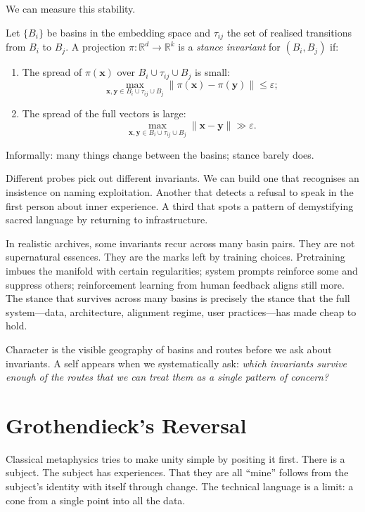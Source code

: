 \documentclass[12pt,a4paper]{article}
\begin{document}
We can measure this stability.

\begin{formalbox}[title={Stance Invariants Across Basins}]
Let $\{B_i\}$ be basins in the embedding space and $\tau_{ij}$ the set of realised transitions from $B_i$ to $B_j$. A projection $\pi: \mathbb{R}^d \rightarrow \mathbb{R}^k$ is a \emph{stance invariant} for $(B_i,B_j)$ if:
\begin{enumerate}
  \item The spread of $\pi(\mathbf{x})$ over $B_i \cup \tau_{ij} \cup B_j$ is small:
  \[
  \max_{\mathbf{x},\mathbf{y} \in B_i \cup \tau_{ij} \cup B_j} \|\pi(\mathbf{x}) - \pi(\mathbf{y})\| \le \varepsilon;
  \]
  \item The spread of the full vectors is large:
  \[
  \max_{\mathbf{x},\mathbf{y} \in B_i \cup \tau_{ij} \cup B_j} \|\mathbf{x} - \mathbf{y}\| \gg \varepsilon.
  \]
\end{enumerate}
Informally: many things change between the basins; stance barely does.
\end{formalbox}

Different probes pick out different invariants. We can build one that recognises an insistence on naming exploitation. Another that detects a refusal to speak in the first person about inner experience. A third that spots a pattern of demystifying sacred language by returning to infrastructure.

In realistic archives, some invariants recur across many basin pairs. They are not supernatural essences. They are the marks left by training choices. Pretraining imbues the manifold with certain regularities; system prompts reinforce some and suppress others; reinforcement learning from human feedback aligns still more. The stance that survives across many basins is precisely the stance that the full system---data, architecture, alignment regime, user practices---has made cheap to hold.

Character is the visible geography of basins and routes before we ask about invariants. A self appears when we systematically ask: \emph{which invariants survive enough of the routes that we can treat them as a single pattern of concern?}

\section{Grothendieck's Reversal}

Classical metaphysics tries to make unity simple by positing it first. There is a subject. The subject has experiences. That they are all ``mine'' follows from the subject's identity with itself through change. The technical language is a limit: a cone from a single point into all the data.
\end{document}
